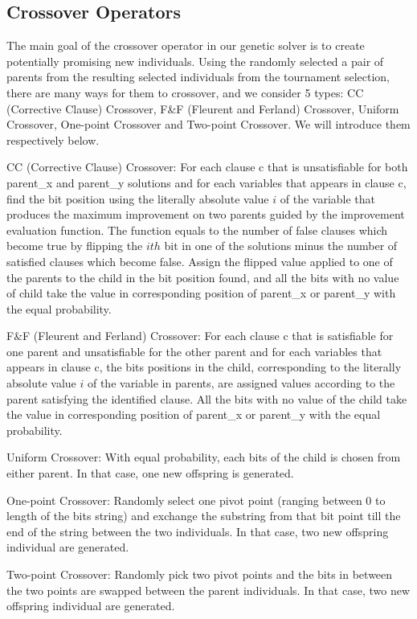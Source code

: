\subsection{Crossover Operators}
The main goal of the crossover operator in our genetic solver is to create potentially promising new individuals. Using the randomly selected a pair of parents from the resulting selected individuals from the tournament selection, there are many ways for them to crossover, and we consider 5 types: CC (Corrective Clause) Crossover, F\&F (Fleurent and Ferland) Crossover, Uniform Crossover, One-point Crossover and Two-point Crossover. We will introduce them respectively below.

CC (Corrective Clause) Crossover:
For each clause c that is unsatisfiable for both parent\_x and parent\_y solutions and for each variables that appears in clause c, find the bit position using the literally absolute value $i$ of the variable that produces the maximum improvement on two parents guided by the improvement evaluation function. The function equals to the number of false clauses which become true by ﬂipping the $ith$ bit in one of the solutions minus the number of satisﬁed clauses which become false. Assign the flipped value applied to one of the parents to the child in the bit position found, and all the bits with no value of child take the value in corresponding position of parent\_x or parent\_y with the equal probability.

F\&F (Fleurent and Ferland) Crossover:
For each clause c that is satisfiable for one parent and unsatisfiable for the other parent and for each variables that appears in clause c, the bits positions in the child, corresponding to the literally absolute value $i$ of the variable in parents, are assigned values according to the parent satisfying the identified clause. All the bits with no value of the child take the value in corresponding position of parent\_x or parent\_y with the equal probability.

Uniform Crossover:
With equal probability, each bits of the child is chosen from either parent. In that case, one new offspring is generated.

One-point Crossover:
Randomly select one pivot point (ranging between 0 to length of the bits string) and exchange the substring from that bit point till the end of the string between the two individuals. In that case, two new offspring individual are generated.

Two-point Crossover:
Randomly pick two pivot points and the bits in between the two points are swapped between the parent individuals. In that case, two new offspring individual are generated.
